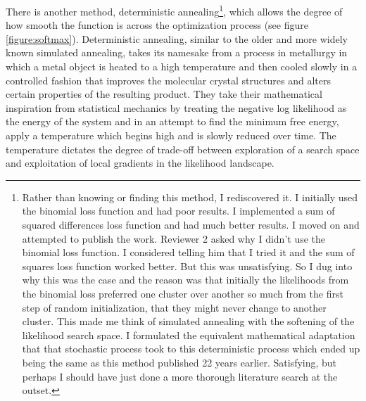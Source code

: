 \par{
There is another method, deterministic annealing\footnote{Rather than knowing or finding this method, I rediscovered it. I initially used the binomial loss function and had poor results. I implemented a sum of squared differences loss function and had much better results. I moved on and attempted to publish the work. Reviewer 2 asked why I didn't use the binomial loss function. I considered telling him that I tried it and the sum of squares loss function worked better. But this was unsatisfying. So I dug into why this was the case and the reason was that initially the likelihoods from the binomial loss preferred one cluster over another so much from the first step of random initialization, that they might never change to another cluster. This made me think of simulated annealing with the softening of the likelihood search space. I formulated the equivalent mathematical adaptation that that stochastic process took to this deterministic process which ended up being the same as this method published 22 years earlier. Satisfying, but perhaps I should have just done a more thorough literature search at the outset. }, which allows the degree of how smooth the function is across the optimization process\cite{annealing}\cite{annealing2} (see figure \ref{figure:softmax}). Deterministic annealing, similar to the older and more widely known simulated annealing\cite{simannealing}, takes its namesake from a process in metallurgy in which a metal object is heated to a high temperature and then cooled slowly in a controlled fashion that improves the molecular crystal structures and alters certain properties of the resulting product. They take their mathematical inspiration from statistical mechanics by treating the negative log likelihood as the energy of the system and in an attempt to find the minimum free energy, apply a temperature which begins high and is slowly reduced over time. The temperature dictates the degree of trade-off between exploration of a search space and exploitation of local gradients in the likelihood landscape. }

